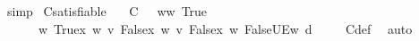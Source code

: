 \begin{isabellebody}
\ simp%
\endisatagproof
{\isafoldproof}%
%
\isadelimproof
\isanewline
%
\endisadelimproof
\isanewline
{}\isamarkupfalse%
\ {\isasymGamma}\isactrlsub C{\isacharunderscore}{\kern0pt}satisfiable{\isacharcolon}{\kern0pt}\isanewline
\ \ {\isachardoublequoteopen}{\isasymforall}{\isasymgamma}{\isachardot}{\kern0pt}\ {\isasymGamma}\isactrlsub C\ {\isasymgamma}\ {\isasymlongrightarrow}\ {\isacharparenleft}{\kern0pt}{\isasymforall}w{\isacharcolon}{\kern0pt}{\isacharparenleft}{\kern0pt}{\isasymlambda}w{\isacharcolon}{\kern0pt}{\isacharcolon}{\kern0pt}{\isasymw}{\isachardot}{\kern0pt}\ True{\isacharparenright}{\kern0pt}{\isachardot}{\kern0pt}\isanewline
\ \ \ \ \ \ {\isasymlangle}{\isacharparenleft}{\kern0pt}{\isasymlambda}w{\isachardot}{\kern0pt}\ True{\isacharparenright}{\kern0pt}{\isacharcomma}{\kern0pt}{\isacharparenleft}{\kern0pt}{\isasymlambda}x\ w\ v{\isachardot}{\kern0pt}\ False{\isacharparenright}{\kern0pt}{\isacharcomma}{\kern0pt}{\isacharparenleft}{\kern0pt}{\isasymlambda}x\ w\ v{\isachardot}{\kern0pt}\ False{\isacharparenright}{\kern0pt}{\isacharcomma}{\kern0pt}{\isacharparenleft}{\kern0pt}{\isasymlambda}x\ w{\isachardot}{\kern0pt}\ False{\isacharparenright}{\kern0pt}{\isacharcomma}{\kern0pt}UEw\ {\isasymTurnstile}\isactrlsup d\ {\isasymgamma}{\isacharparenright}{\kern0pt}{\isachardoublequoteclose}\isanewline
%
\isadelimproof
\ \ %
\endisadelimproof
%
\isatagproof
{}\isamarkupfalse%
\ {\isasymGamma}\isactrlsub C{\isacharunderscore}{\kern0pt}def\ \isamarkupfalse%
\ auto%
\endisatagproof
{\isafoldproof}%
%
\isadelimproof
\isanewline
%
\endisadelimproof
%
\isadelimtheory
\isanewline
%
\endisadelimtheory
%
\isatagtheory
{}\isamarkupfalse%
%
\endisatagtheory
{\isafoldtheory}%
%
\isadelimtheory
%
\endisadelimtheory
%
\end{isabellebody}%
\endinput
